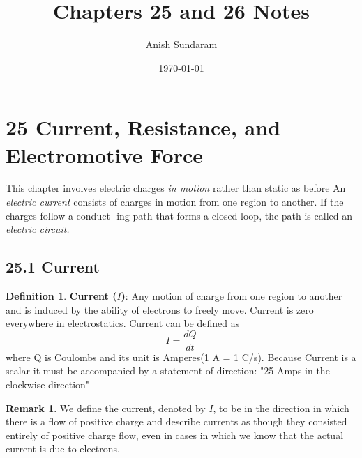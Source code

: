 \documentclass[12pt]{amsart}
\title{Chapters 25 and 26 Notes}
\author{Anish Sundaram}
\date{\today}
\theoremstyle{definition}
\newtheorem{definition}{Definition} %
\newtheorem*{remark}{Remark}        %
\numberwithin{equation}{theorem}    %
\begin{document}
\maketitle

\tableofcontents

\section*{25 Current, Resistance, and Electromotive Force}

This chapter involves electric charges \textit{in motion} rather than static as before
An \textit{electric current} consists of charges in motion from one region to another. 
If the charges follow a conduct- ing path that forms a closed loop, the path is called an \textit{electric circuit.}


\subsection*{25.1 Current}
 \begin{definition}
    \textbf{Current ($I$)}:
    Any motion of charge from one region to another and is induced by the 
    ability of electrons to freely move. Current is zero everywhere in electrostatics.
    Current can be defined as $$I = \frac{dQ}{dt}$$ where Q is Coulombs and 
    its unit is Amperes(1 A = 1 C/s). Because Current is a scalar it must be 
    accompanied by a statement of direction: "25 Amps in the clockwise direction"
    
    \begin{remark}
        We define the current, denoted by $I$, to be in the direction 
    in which there is a flow of positive charge and describe currents as 
    though they consisted entirely of positive charge flow, even in cases 
    in which we know that the actual current is due to electrons.
    \end{remark}
 \end{definition}
\end{document}
